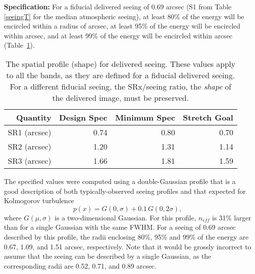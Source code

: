 



\vskip 0.2in 

{\bf Specification:} For a fiducial delivered seeing of 0.69 arcsec
(S1 from Table \ref{seeingT} for the median atmospheric seeing), at least 80\%
of the energy will be encircled within a radius of
arcsec, at least 95\% of the energy will be encircled within
arcsec, and at least 99\% of the energy will be encircled within
arcsec
(Table~\ref{Tspatprof}).

\begin{table}[h]
\begin{tabular}{|r|r|r|r|}
\hline
       Quantity    & Design Spec & Minimum Spec & Stretch Goal \\
\hline
      SR1 (arcsec) &    0.74       &   0.80       &   0.70        \\
      SR2 (arcsec) &    1.20       &   1.31       &   1.14        \\
      SR3 (arcsec) &    1.66       &   1.81       &   1.59        \\
\hline
\end{tabular}
\caption{The spatial profile (shape) for delivered seeing. These values
  apply to all the bands, as they are defined for a
  fiducial delivered seeing. For a different fiducial seeing, the
  SRx/seeing ratio, \ie the {\it shape} of the delivered image,
  must be preserved.}
\label{Tspatprof}
\end{table}

The specified values were computed using a double-Gaussian profile that is
a good description of both typically-observed seeing profiles and that
expected for Kolmogorov turbulence
\begin{equation}
       p(x) = G(0,\sigma) + 0.1\, G(0,2\sigma),
\end{equation}
where $G(\mu,\sigma)$ is a two-dimensional Gaussian. For this profile,
$n_{eff}$ is 31\% larger than for a single Gaussian with the same FWHM. For
a seeing of 0.69 arcsec described by this profile, the radii enclosing
80\%, 95\% and 99\% of the energy are 0.67, 1.09, and 1.51 arcsec,
respectively. Note that it would be grossly incorrect to assume that the
seeing can be described by a single Gaussian, as the corresponding radii
are 0.52, 0.71, and 0.89 arcsec.

